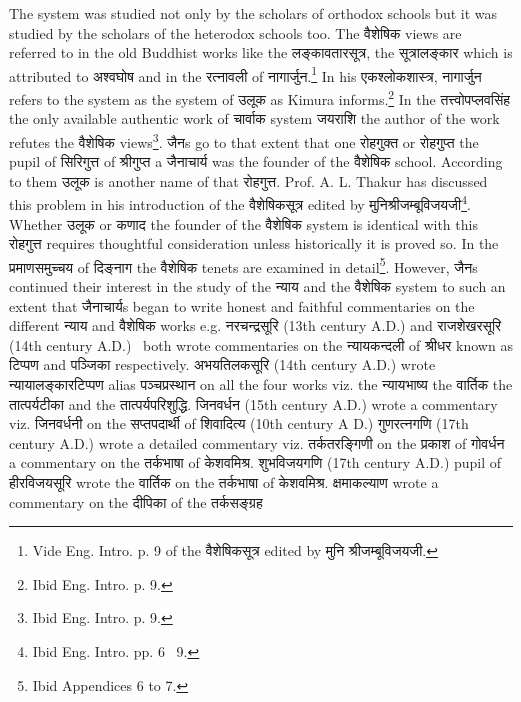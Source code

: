 \documentclass[11pt, openany]{book}
\begin{document}
\newpage
The system was studied not only by the scholars of orthodox schools but it was studied by the scholars of the heterodox schools too. The वैशेषिक views are referred to in the old Buddhist works like the लङ्कावतारसूत्र, the सूत्रालङ्कार which is attributed to अश्वघोष and in the रत्नावली of नागार्जुन.\renewcommand{\thefootnote}{1}\footnote{Vide Eng. Intro. p. 9 of the वैशेषिकसूत्र edited by मुनि श्रीजम्बूविजयजी.} In his एकश्लोकशास्त्र, नागार्जुन refers to the system as the system of उलूक as Kimura informs.\renewcommand{\thefootnote}{2}\footnote{Ibid Eng. Intro. p. 9.} In the तत्त्वोपप्लवसिंह the only available authentic work of चार्वाक system जयराशि the author of the work refutes the वैशेषिक views\renewcommand{\thefootnote}{3}\footnote{Ibid Eng. Intro. p. 9.}. जैनs go to that extent that one रोहगुक्त or रोहगुप्त the pupil of सिरिगुत्त of श्रीगुप्त a जैनाचार्य was the founder of the वैशेषिक school. According to them उलूक is another name of that रोहगुत्त. Prof. A. L. Thakur has discussed this problem in his introduction of the वैशेषिकसूत्र edited by मुनिश्रीजम्बूविजयजी\renewcommand{\thefootnote}{4}\footnote{Ibid Eng. Intro. pp. 6 \textendash\ 9.}. Whether उलूक or कणाद the founder of the वैशेषिक system is identical with this रोहगुत्त requires thoughtful consideration unless historically it is proved so. In the प्रमाणसमुच्चय of दिङ्नाग the वैशेषिक tenets are examined in detail\renewcommand{\thefootnote}{5}\footnote{Ibid Appendices 6 to 7.}. However, जैनs continued their interest in the study of the न्याय and the वैशेषिक system to such an extent that जैनाचार्यs began to write honest and faithful commentaries on the different न्याय and वैशेषिक works e.g. नरचन्द्रसूरि (13th century A.D.) and राजशेखरसूरि (14th century A.D.) \textendash\ both wrote commentaries on the न्यायकन्दली of श्रीधर known as टिप्पण and पञ्जिका respectively. अभयतिलकसूरि (14th century A.D.) wrote न्यायालङ्कारटिप्पण alias पञ्चप्रस्थान on all the four works viz. the न्यायभाष्य the वार्तिक the तात्पर्यटीका and the तात्पर्यपरिशुद्धि. जिनवर्धन (15th century A.D.) wrote a commentary viz. जिनवर्धनी on the सप्तपदार्थी of शिवादित्य (10th century A D.) गुणरत्नगणि (17th century A.D.) wrote a detailed commentary viz. तर्कतरङ्गिणी on the प्रकाश of गोवर्धन a commentary on the तर्कभाषा of केशवमिश्र. शुभविजयगणि (17th century A.D.) pupil of हीरविजयसूरि wrote the वार्तिक on the तर्कभाषा of केशवमिश्र. क्षमाकल्याण wrote a commentary on the दीपिका of the तर्कसङ्ग्रह
\end{document}
